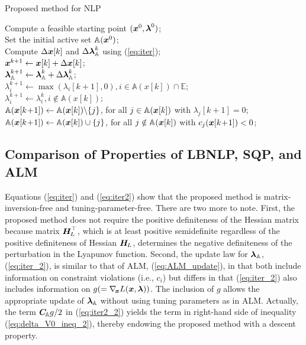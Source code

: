 \documentclass[journal]{IEEEtranTIE}
\newtheorem{remark}{Remark}
\begin{document}

\begin{algorithm}[!t]
\caption{Proposed method for NLP} 
\label{alg1}
Compute a feasible starting point $(\boldsymbol{x}^0,\boldsymbol{\lambda}^0)$;\\
Set the initial active set $\mathbb{A}(\boldsymbol{x}^0)$;\\
{
    Compute $\Delta\boldsymbol{x}[k]$ and $\Delta\boldsymbol{\lambda}_{\mathbb{A}}^{k}$ using (\ref{eq:iter}); \\
    $\boldsymbol{x}^{k + 1} \leftarrow \boldsymbol{x}[k] + \Delta\boldsymbol{x}[k]$;\\
    $\boldsymbol{\lambda}_{\mathbb{A}}^{k + 1} \leftarrow {\boldsymbol{\lambda}_{\mathbb{A}}^{k}} + {\Delta\boldsymbol{\lambda}_{\mathbb{A}}^{k}}$;\\
    $\lambda_i^{k + 1} \leftarrow \max(\lambda_i[k\!+\!1],0), i \in \mathbb{A}(x[k]) \cap \mathbb{E}$;\\
    $\lambda_i^{k + 1} \leftarrow \lambda _{i}^{k}, i \notin \mathbb{A}(x[k])$;\\
    $\mathbb{A}(\boldsymbol{x}[k\!+\!1]) \leftarrow \mathbb{A}(\boldsymbol{x}[k]) \backslash \{j\}$, for all $j \in \mathbb{A}(\boldsymbol{x}[k])$ with $\lambda_j[k\!+\!1] = 0$;\\ %
    $\mathbb{A}(\boldsymbol{x}[k\!+\!1]) \leftarrow \mathbb{A}(\boldsymbol{x}[k]) \cup \{j\}$, for all $j \notin \mathbb{A}(\boldsymbol{x}[k])$ with $c_j(\boldsymbol{x}[k\!+\!1]) < 0$;\\ %
 }
\end{algorithm}

\subsection{Comparison of Properties of LBNLP, SQP, and ALM}
\label{subsec:prop}

Equations (\ref{eq:iter}) and (\ref{eq:iter2}) show that the proposed method is matrix-inversion-free and tuning-parameter-free. There are two more to note. First, the proposed method does not require the positive definiteness of the Hessian matrix because matrix $\boldsymbol{H}_{\! L}^\top$, which is at least positive semidefinite regardless of the positive definiteness of Hessian $\boldsymbol{H}_{\!L}$, determines the negative definiteness of the perturbation in the Lyapunov function.
Second, the update law for $\boldsymbol{\lambda}_{\mathbb{A}}$, (\ref{eq:iter_2}), is similar to that of ALM, (\ref{eq:ALM_update}), in that both include information on constraint violations (i.e., $c_i$) but differs in that (\ref{eq:iter_2}) also includes information on $g(= \nabla_{\!\boldsymbol{x}}L(\boldsymbol{x},\boldsymbol{\lambda}))$. The inclusion of $g$ allows the appropriate update of $\boldsymbol{\lambda}_{\mathbb{A}}$ without using tuning parameters as in ALM. Actually, the term $\boldsymbol{C}_{\!\mathbb{A}}g/2$ in (\ref{eq:iter2_2}) yields the term in right-hand side of inequality (\ref{eq:delta_V0_ineq_2}), thereby endowing the proposed method with a descent property. 
\end{document}
